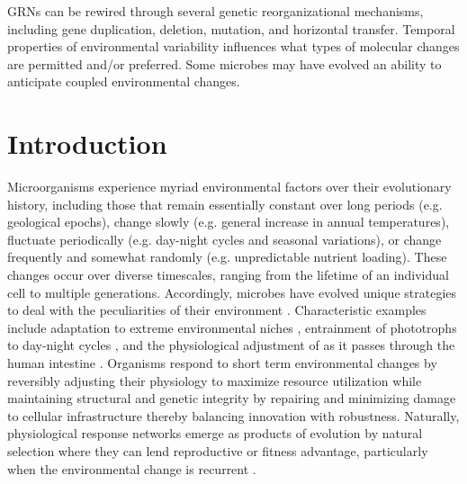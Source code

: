GRNs can be rewired through several genetic reorganizational mechanisms, including gene duplication, deletion, mutation, and horizontal transfer. Temporal properties of environmental variability influences what types of molecular changes are permitted and/or preferred. Some microbes may have evolved an ability to anticipate coupled environmental changes. 

\section{Introduction}

Microorganisms experience myriad environmental factors over their evolutionary history, including those that remain essentially constant over long periods (e.g. geological epochs), change slowly (e.g. general increase in annual temperatures), fluctuate periodically (e.g. day-night cycles and seasonal variations), or change frequently and somewhat randomly (e.g. unpredictable nutrient loading).  These changes occur over diverse timescales, ranging from the lifetime of an individual cell to multiple generations. Accordingly, microbes have evolved unique strategies to deal with the peculiarities of their environment \cite{galhardo_mutation_2007}.  Characteristic examples include adaptation to extreme environmental niches \cite{kennedy_understanding_2001,kushner_microbial_1978}, entrainment of phototrophs to day-night cycles \cite{woelfle_adaptive_2004,ouyang_resonating_1998}, and the physiological adjustment of \eco as it passes through the human intestine \cite{mitchell_adaptive_2009}.  Organisms respond to short term environmental changes by reversibly adjusting their physiology to maximize resource utilization while maintaining structural and genetic integrity by repairing and minimizing damage to cellular infrastructure \cite{huisman_sensing_1994,ram_community_2005} thereby balancing innovation with robustness. Naturally, physiological response networks emerge as products of evolution by natural selection where they can lend reproductive or fitness advantage, particularly when the environmental change is recurrent \cite{hochachka_biochemical_2002}.

